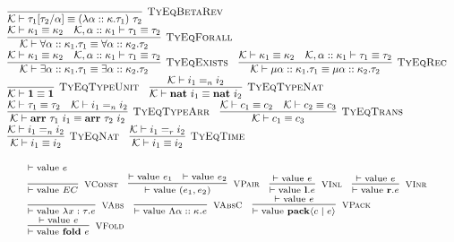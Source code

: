 \documentclass[fleqn]{article}
\begin{document}
\[\begin{array}{l}
    \infer[\textsc{TyEqBetaRev}]{\mathcal{K} \vdash \tau_1[\tau_2/\alpha] \equiv (\lambda \alpha :: \kappa. \tau_1)~\tau_2}{} \\
    \infer[\textsc{TyEqForall}]{\mathcal{K} \vdash \forall \alpha :: \kappa_1. \tau_1 \equiv \forall \alpha :: \kappa_2. \tau_2}{\mathcal{K} \vdash \kappa_1 \equiv \kappa_2 & \mathcal{K},\alpha :: \kappa_1 \vdash \tau_1 \equiv \tau_2} \\
    \infer[\textsc{TyEqExists}]{\mathcal{K} \vdash \exists \alpha :: \kappa_1. \tau_1 \equiv \exists \alpha :: \kappa_2. \tau_2}{\mathcal{K} \vdash \kappa_1 \equiv \kappa_2 & \mathcal{K},\alpha :: \kappa_1 \vdash \tau_1 \equiv \tau_2} \hspace{1em}
    \infer[\textsc{TyEqRec}]{\mathcal{K} \vdash \mu \alpha :: \kappa_1. \tau_1 \equiv \mu \alpha :: \kappa_2. \tau_2}{\mathcal{K} \vdash \kappa_1 \equiv \kappa_2 & \mathcal{K},\alpha :: \kappa_1 \vdash \tau_1 \equiv \tau_2} \\
    \infer[\textsc{TyEqTypeUnit}]{\mathcal{K} \vdash \mathbf{1} \equiv \mathbf{1}}{} \hspace{1em}
    \infer[\textsc{TyEqTypeNat}]{\mathcal{K} \vdash \mathbf{nat}~i_1 \equiv \mathbf{nat}~i_2}{\mathcal{K} \vdash i_1 =_n i_2} \\
    \infer[\textsc{TyEqTypeArr}]{\mathcal{K} \vdash \mathbf{arr}~\tau_1~i_1 \equiv \mathbf{arr}~\tau_2~i_2}{\mathcal{K} \vdash \tau_1 \equiv \tau_2 & \mathcal{K} \vdash i_1 =_n i_2} \hspace{1em}
    \infer[\textsc{TyEqTrans}]{\mathcal{K} \vdash c_1 \equiv c_3}{\mathcal{K} \vdash c_1 \equiv c_2 & \mathcal{K} \vdash c_2 \equiv c_3} \\
    \infer[\textsc{TyEqNat}]{\mathcal{K} \vdash i_1 \equiv i_2}{\mathcal{K} \vdash i_1 =_n i_2} \hspace{1em}
    \infer[\textsc{TyEqTime}]{\mathcal{K} \vdash i_1 \equiv i_2}{\mathcal{K} \vdash i_1 =_r i_2}
\end{array}
\]

\[
\scriptsize
\begin{array}{l}
    \vdash \mathrm{value}~e \\
    \infer[\textsc{VConst}]{\vdash \mathrm{value}~EC}{} \hspace{1em}
    \infer[\textsc{VPair}]{\vdash \mathrm{value}~(e_1,e_2)}{\vdash \mathrm{value}~e_1 & \vdash \mathrm{value}~e_2} \hspace{1em}
    \infer[\textsc{VInl}]{\vdash \mathrm{value}~\mathbf{l}.e}{\vdash \mathrm{value}~e} \hspace{1em}
    \infer[\textsc{VInr}]{\vdash \mathrm{value}~\mathbf{r}.e}{\vdash \mathrm{value}~e} \\
    \infer[\textsc{VAbs}]{\vdash \mathrm{value}~\lambda x : \tau.e}{} \hspace{1em}
    \infer[\textsc{VAbsC}]{\vdash \mathrm{value}~\Lambda \alpha :: \kappa.e}{} \hspace{1em}
    \infer[\textsc{VPack}]{\vdash \mathrm{value}~\mathbf{pack}\langle c \mid e \rangle}{\vdash \mathrm{value}~e} \\
    \infer[\textsc{VFold}]{\vdash \mathrm{value}~\mathbf{fold}~e}{\vdash \mathrm{value}~e}
\end{array}
\]
\end{document}
